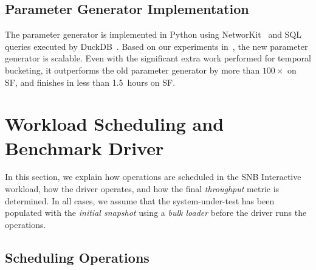 \subsection{Parameter Generator Implementation}
\label{sec:paramgen-implementation}

%
The parameter generator is implemented in Python using NetworKit~\cite{lit:networkit} and SQL queries executed by DuckDB~\cite{DBLP:conf/sigmod/RaasveldtM19}.
%
%
Based on our experiments in~\cite[Figure~4.3]{david-puroja-msc}, the new parameter generator is scalable.
Even with the significant extra work performed for temporal bucketing,
it outperforms the old parameter generator by more than $100\times$ on SF,
and finishes in less than 1.5~hours on SF.

\section{Workload Scheduling and Benchmark Driver}
\label{sec:workload-and-driver}

In this section, we explain how operations are scheduled in the SNB Interactive workload, how the driver operates, and how the final \emph{throughput} metric is determined.
In all cases, we assume that the system-under-test has been populated with the \emph{initial snapshot} using a \emph{bulk loader} before the driver runs the operations.

\subsection{Scheduling Operations}
\label{sec:scheduling}

